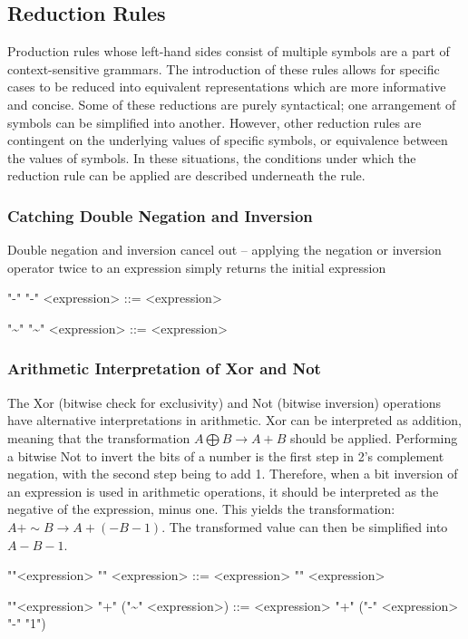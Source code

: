 \subsection{Reduction Rules} \label{subsec:redrules}
Production rules whose left-hand sides consist of multiple symbols are a part of context-sensitive grammars. The introduction of these rules allows for specific cases to be reduced into equivalent representations which are more informative and concise. Some of these reductions are purely syntactical; one arrangement of symbols can be simplified into another. However, other reduction rules are contingent on the underlying values of specific symbols, or equivalence between the values of symbols. In these situations, the conditions under which the reduction rule can be applied are described underneath the rule.

\subsubsection{Catching Double Negation and Inversion}
Double negation and inversion cancel out -- applying the negation or inversion operator twice to an expression simply returns the initial expression
\begin{center}
\begin{grammar}
    "-" "-" <expression> ::= <expression>
    
    "\sim" "\sim" <expression> ::= <expression>
\end{grammar}
\end{center}
\subsubsection{Arithmetic Interpretation of Xor and Not}
The Xor (bitwise check for exclusivity) and Not (bitwise inversion) operations have alternative interpretations in arithmetic. Xor can be interpreted as addition, meaning that the transformation $A \bigoplus B \rightarrow A + B$ should be applied. Performing a bitwise Not to invert the bits of a number is the first step in 2's complement negation, with the second step being to add 1. Therefore, when a bit inversion of an expression is used in arithmetic operations, it should be interpreted as the negative of the expression, minus one. This yields the transformation: $A + \sim B \rightarrow A + (- B - 1)$. The transformed value can then be simplified into $A - B - 1$.
\setlength{\grammarindent}{2.5cm}
\begin{center}
    \begin{grammar}
    ""<expression> "\bigoplus" <expression> ::= <expression> "\+" <expression>
    
    ""<expression> "+" ("\sim" <expression>) ::= <expression> "+" ("-" <expression> "-" "1")
\end{grammar}
\end{center}


